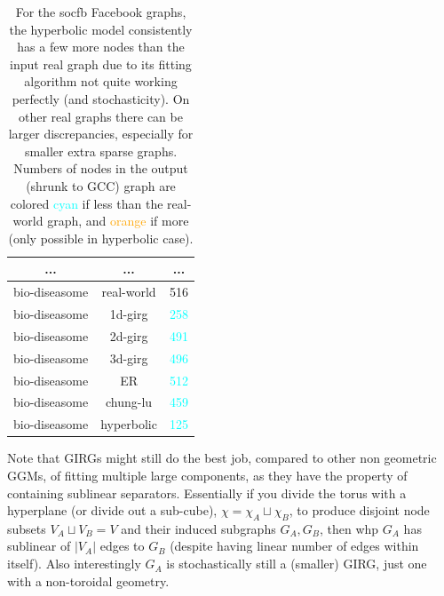\begin{table}[]
\begin{tabular}{|c|c|c|}
    ... & ... & ... \\ \hline
    bio-diseasome & real-world & 516 \\ \hline
    bio-diseasome & 1d-girg & \textcolor{cyan}{258} \\ \hline
    bio-diseasome & 2d-girg & \textcolor{cyan}{491} \\ \hline
    bio-diseasome & 3d-girg & \textcolor{cyan}{496} \\ \hline
    bio-diseasome & ER & \textcolor{cyan}{512} \\ \hline
    bio-diseasome & chung-lu & \textcolor{cyan}{459} \\ \hline
    bio-diseasome & hyperbolic & \textcolor{cyan}{125} \\ \hline
    \end{tabular}
    \caption{
    For the socfb Facebook graphs, the hyperbolic model consistently has a few more nodes than the input real graph due to its fitting algorithm not quite working perfectly (and stochasticity).
    On other real graphs there can be larger discrepancies, especially for smaller extra sparse graphs.
    Numbers of nodes in the output (shrunk to GCC) graph are colored \textcolor{cyan}{cyan} if less than the real-world graph, and \textcolor{orange}{orange} if more (only possible in hyperbolic case).
    }
    \label{tab:blasius_HRG_n_fitting_renunciation}
\end{table}
    



Note that GIRGs might still do the best job, compared to other non geometric GGMs, of fitting multiple large components, as they have the property of containing sublinear separators. Essentially if you divide the torus with a hyperplane (or divide out a sub-cube), $\chi = \chi_A \sqcup \chi_B$, to produce disjoint node subsets $V_A \sqcup V_B = V$ and their induced subgraphs $G_A, G_B$, then whp $G_A$ has sublinear of $|V_A|$ edges to $G_B$ (despite having linear number of edges within itself). Also interestingly $G_A$ is stochastically still a (smaller) GIRG, just one with a non-toroidal geometry.





